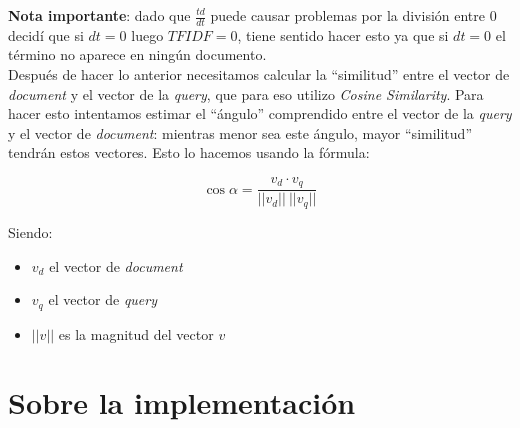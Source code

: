 \documentclass{report}
\begin{document}
{\bf \color{red} Nota importante}: dado que $\frac{td}{dt}$ puede causar problemas por la 
división entre $0$ decidí que si $dt = 0$ luego $TFIDF = 0$, tiene sentido hacer esto ya 
que si $dt = 0$ el término no aparece en ningún documento.\\

Después de hacer lo anterior necesitamos calcular la ``similitud'' entre el vector de 
{\it document} y el vector de la {\it query}, que para eso utilizo 
{\it Cosine Similarity}. 
Para hacer esto intentamos estimar el ``ángulo'' comprendido entre el vector de la 
{\it query} y el vector de {\it document}: mientras menor sea este ángulo, mayor 
``similitud'' tendrán estos vectores. Esto lo hacemos usando la fórmula:

\[\cos \alpha = \frac{v_d \cdot v_q}{||v_d|| ~ ||v_q||}\]

Siendo:

\begin{itemize}
 \item $v_d$ el vector de {\it document}
 \item $v_q$ el vector de {\it query}
 \item $||v||$ es la magnitud del vector $v$
\end{itemize}

\section*{Sobre la implementaci\'on}
\end{document}
